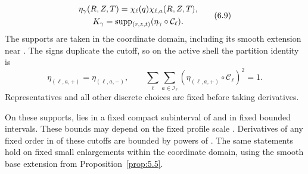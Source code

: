 \begin{equation}
\begin{gathered}
 \eta_\gamma(R,Z,T)=\chi_\ell(q)\chi_{\ell,a}(R,Z,T),\\
 K_\gamma=\operatorname{supp}_{(r,z,t)}(\eta_\gamma\circ\mathcal C_\ell).
\end{gathered}
 \tag{6.9}\label{eq:6.9}
\end{equation}
The supports are taken in the coordinate domain, including its smooth extension near . The signs duplicate the cutoff, so on the active shell the partition identity is
\[
 \eta_{(\ell,a,+)}=\eta_{(\ell,a,-)},
 \qquad
 \sum_\ell\sum_{a\in\mathcal I_\ell}(\eta_{(\ell,a,+)}\circ\mathcal C_\ell)^2=1.
\]
Representatives and all other discrete choices are fixed before taking derivatives.

On these supports,  lies in a fixed compact subinterval of  and  in fixed bounded intervals. These bounds may depend on the fixed profile scale . Derivatives of any fixed order in  of these cutoffs are bounded by powers of . The same statements hold on fixed small enlargements within the coordinate domain, using the smooth base extension from Proposition~\ref{prop:5.5}.


